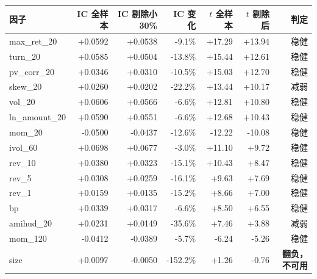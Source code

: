 \begin{tabular}{@{}lrrrrrr@{}}
\toprule
因子 & IC 全样本 & IC 剔除小30\% & IC 变化 & $t$ 全样本 & $t$ 剔除后 & 判定 \\
\midrule
max\_ret\_20 & +0.0592 & +0.0538 & -9.1\% & +17.29 & +13.94 & 稳健 \\
turn\_20 & +0.0585 & +0.0504 & -13.8\% & +15.44 & +12.61 & 稳健 \\
pv\_corr\_20 & +0.0346 & +0.0310 & -10.5\% & +15.03 & +12.70 & 稳健 \\
skew\_20 & +0.0260 & +0.0202 & -22.2\% & +13.44 & +10.17 & 减弱 \\
vol\_20 & +0.0606 & +0.0566 & -6.6\% & +12.81 & +10.80 & 稳健 \\
ln\_amount\_20 & +0.0590 & +0.0551 & -6.6\% & +12.68 & +10.43 & 稳健 \\
mom\_20 & -0.0500 & -0.0437 & -12.6\% & -12.22 & -10.08 & 稳健 \\
ivol\_60 & +0.0698 & +0.0677 & -3.0\% & +11.10 & +9.72 & 稳健 \\
rev\_10 & +0.0380 & +0.0323 & -15.1\% & +10.43 & +8.47 & 稳健 \\
rev\_5 & +0.0308 & +0.0259 & -16.1\% & +9.63 & +7.69 & 稳健 \\
rev\_1 & +0.0159 & +0.0135 & -15.2\% & +8.66 & +7.00 & 稳健 \\
bp & +0.0339 & +0.0317 & -6.6\% & +8.50 & +6.55 & 稳健 \\
amihud\_20 & +0.0231 & +0.0149 & -35.6\% & +7.46 & +3.88 & 减弱 \\
mom\_120 & -0.0412 & -0.0389 & -5.7\% & -6.24 & -5.26 & 稳健 \\
size & +0.0097 & -0.0050 & -152.2\% & +1.26 & -0.76 & \textbf{翻负，不可用} \\
\bottomrule
\end{tabular}
